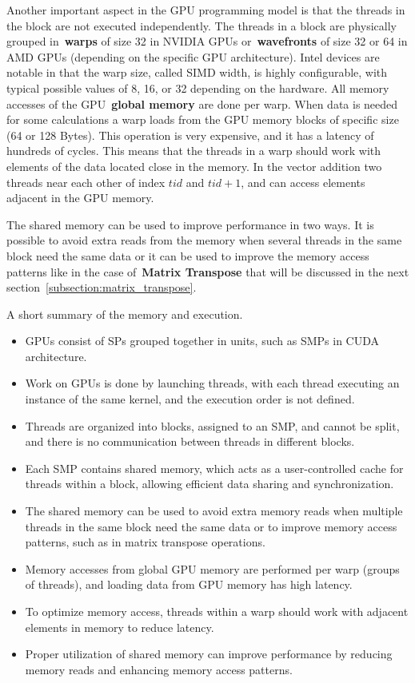 \par
Another important aspect in the GPU programming model is that the threads in the block are not executed independently.
The threads in a block are physically grouped in~\textbf{warps} of size 32 in NVIDIA GPUs or~\textbf{wavefronts} of size 32 or 64 in AMD GPUs (depending on the specific GPU architecture).
Intel devices are notable in that the warp size, called SIMD width, is highly configurable, with typical possible values of 8, 16, or 32 depending on the hardware.
All memory accesses of the GPU~\textbf{global memory} are done per warp.
When data is needed for some calculations a warp loads from the GPU memory blocks of specific size (64 or 128 Bytes).
This operation is very expensive, and it has a latency of hundreds of cycles. 
This means that the threads in a warp should work with elements of the data located close in the memory.
In the vector addition two threads near each other of index $tid$ and $tid+1$, and can access elements adjacent in the GPU memory.


\par
The shared memory can be used to improve performance in two ways.
It is possible to avoid extra reads from the memory when several threads in the same block need the same data or it can be used to improve the memory access patterns like in the case of~\textbf{Matrix Transpose} that will be discussed in the next section~\ref{subsection:matrix_transpose}.


\par
A short summary of the memory and execution.
\begin{itemize}
    \item GPUs consist of SPs grouped together in units, such as SMPs in CUDA architecture.
    \item Work on GPUs is done by launching threads, with each thread executing an instance of the same kernel, and the execution order is not defined.
    \item Threads are organized into blocks, assigned to an SMP, and cannot be split, and there is no communication between threads in different blocks.
    \item Each SMP contains shared memory, which acts as a user-controlled cache for threads within a block, allowing efficient data sharing and synchronization.
    \item The shared memory can be used to avoid extra memory reads when multiple threads in the same block need the same data or to improve memory access patterns, such as in matrix transpose operations.
    \item Memory accesses from global GPU memory are performed per warp (groups of threads), and loading data from GPU memory has high latency.
    \item To optimize memory access, threads within a warp should work with adjacent elements in memory to reduce latency.
    \item Proper utilization of shared memory can improve performance by reducing memory reads and enhancing memory access patterns.
\end{itemize}


